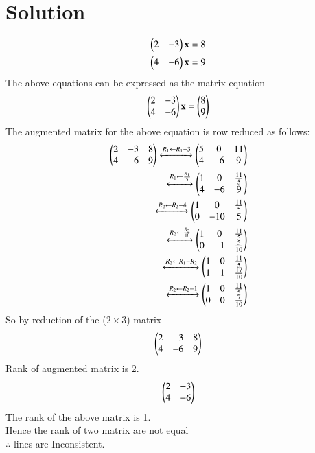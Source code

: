 \documentclass[journal,12pt,twocolumn]{IEEEtran}
\begin{document}
\section{Solution}
\begin{align}
    \begin{pmatrix}2&-3\end{pmatrix}\mathbf{x}=8\\
    \begin{pmatrix}4&-6\end{pmatrix}\mathbf{x}=9
\end{align}
The above equations can be expressed as the matrix equation
\begin{align}
     \begin{pmatrix}2&-3\\4&-6\end{pmatrix}\mathbf{x}=\begin{pmatrix}8\\9\end{pmatrix}
\end{align}
The augmented matrix for the above equation
is row reduced as follows:
\begin{align}
     \begin{pmatrix}2& -3& 8\\
           4 & -6 & 9\end{pmatrix}
          \xleftrightarrow{R_1 \leftarrow{R_1}+3}
    \begin{pmatrix}5& 0 & 11\\
        4&-6&9\end{pmatrix}\\
        \xleftrightarrow{R_1\leftarrow\frac{R_1}{5}}
    \begin{pmatrix}1& 0 &\frac{11}{5}\\4&-6&9\end{pmatrix}\\
    \xleftrightarrow{R_2\leftarrow{R_2}-4}
    \begin{pmatrix}1& 0 &\frac{11}{5}\\0&-10& 5\end{pmatrix}\\
    \xleftrightarrow{R_2\leftarrow \frac{R_2}{10}}
    \begin{pmatrix}1&0&\frac{11}{5}\\0&-1&\frac{5}{10}\end{pmatrix}\\
    \xleftrightarrow{R_2 \leftarrow{R_1-R_2}}
    \begin{pmatrix}1 & 0 & \frac{11}{5}\\ 1 & 1& \frac{17}{10}\end{pmatrix}\\
    \xleftrightarrow{R_2 \leftarrow{R_2-1}}
    \begin{pmatrix}1 & 0 & \frac{11}{5} \\ 0 & 0 &\frac{7}{10}\end{pmatrix}
\end{align}
 So by reduction of the ($2\times3$) matrix
 \begin{align}
     \begin{pmatrix}2&-3&8\\4&-6&9\end{pmatrix}
 \end{align}
 Rank of augmented matrix is 2. 
   \begin{align}
       \begin{pmatrix}2&-3\\4&-6\end{pmatrix}
   \end{align} 
 The rank of the above matrix is 1.\\
 Hence the rank of two matrix are not equal\\
   $\therefore$ lines are Inconsistent.
\end{document}
